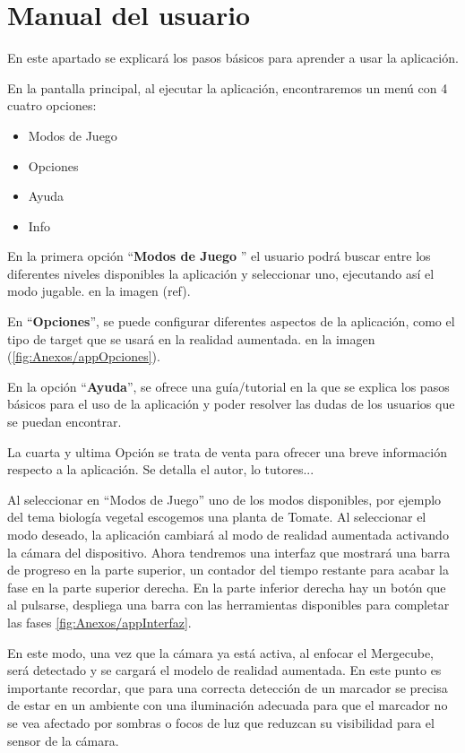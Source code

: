 \section{Manual del usuario}

En este apartado se explicará los pasos básicos para aprender a usar la aplicación.

En la pantalla principal, al ejecutar la aplicación, encontraremos un menú con 4 cuatro opciones: 
\begin{itemize}
	\item Modos de Juego
	\item Opciones
	\item Ayuda
	\item Info
\end{itemize}


En la primera opción ``\textbf{Modos de Juego} '' el usuario podrá buscar entre los diferentes niveles disponibles la aplicación y seleccionar uno, ejecutando así el modo jugable. en la imagen (ref).

En ``\textbf{Opciones}'', se puede configurar diferentes aspectos de la aplicación, como el tipo de target que se usará en la realidad aumentada. en la imagen (\ref{fig:Anexos/appOpciones}).


En la opción ``\textbf{Ayuda}'', se ofrece una guía/tutorial en la que se explica los pasos básicos para el uso de la aplicación y poder resolver las dudas de los usuarios que se puedan encontrar.

La cuarta y ultima Opción se trata de venta para ofrecer una breve información respecto a la aplicación. Se detalla el autor, lo tutores... 



Al seleccionar en ``Modos de Juego'' uno de los modos disponibles, por ejemplo del tema biología vegetal escogemos una planta de Tomate.
Al seleccionar el modo deseado, la aplicación cambiará al modo de realidad aumentada activando la cámara del dispositivo. Ahora tendremos una interfaz que mostrará una barra de progreso en la parte superior, un contador del tiempo restante para acabar la fase en la parte superior derecha. En la parte inferior derecha hay un botón que al pulsarse, despliega una barra con las herramientas disponibles para completar las fases \ref{fig:Anexos/appInterfaz}.

En este modo, una vez que la cámara ya está activa, al enfocar el Mergecube, será detectado y se cargará el modelo de realidad aumentada. En este punto es importante recordar, que para una correcta detección de un marcador se precisa de estar en un ambiente con una iluminación adecuada para que el marcador no se vea afectado por sombras o focos de luz que reduzcan su visibilidad para el sensor de la cámara.

